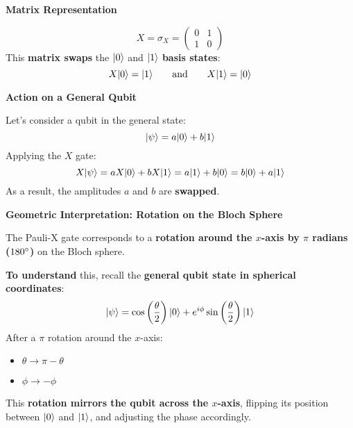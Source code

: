 \highspace
\begin{flushleft}
   \textcolor{Green3}{ \textbf{Matrix Representation}}
\end{flushleft}
\begin{equation}
   X = \sigma_{X} =
   \begin{pmatrix}
      0 & 1 \\ 1 & 0
   \end{pmatrix}
\end{equation}
This \textbf{matrix swaps} the $| 0 \rangle$ and $| 1 \rangle$ \textbf{basis states}:
\begin{equation}
   X| 0 \rangle = | 1 \rangle \hspace{2em} \text{and} \hspace{2em} X| 1 \rangle = | 0 \rangle
\end{equation}

\highspace
\begin{flushleft}
   \textcolor{Green3}{ \textbf{Action on a General Qubit}}
\end{flushleft}
Let's consider a qubit in the general state:
\begin{equation*}
   | \psi \rangle = a| 0 \rangle + b| 1 \rangle
\end{equation*}
Applying the $X$ gate:
\begin{equation*}
   X| \psi \rangle = a X | 0 \rangle + b X | 1 \rangle = a | 1 \rangle + b | 0 \rangle = b | 0 \rangle + a | 1 \rangle
\end{equation*}
As a result, the amplitudes $a$ and $b$ are \textbf{swapped}.

\highspace
\begin{flushleft}
   \textcolor{Green3}{ \textbf{Geometric Interpretation: Rotation on the Bloch Sphere}}
\end{flushleft}
The Pauli-X gate corresponds to a \textbf{rotation around the $x$-axis by $\pi$ radians ($180\degree$)} on the Bloch sphere.

\highspace
\textbf{To understand} this, recall the \textbf{general qubit state in spherical coordinates}:
\begin{equation*}
   | \psi \rangle = \cos\left(\dfrac{\theta}{2}\right) | 0 \rangle + e^{i \phi} \sin\left(\dfrac{\theta}{2}\right) | 1 \rangle
\end{equation*}
After a $\pi$ rotation around the $x$-axis:
\begin{itemize}
   \item $\theta \rightarrow \pi - \theta$
   \item $\phi \rightarrow -\phi$ 
\end{itemize}
This \textbf{rotation mirrors the qubit across the $x$-axis}, flipping its position between $| 0 \rangle$ and $| 1 \rangle$, and adjusting the phase accordingly.

